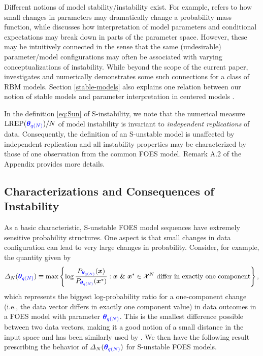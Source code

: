 \documentclass[numbib]{imamat}
\theoremstyle{theorem}
\theoremstyle{lemma}
\theoremstyle{example}
\theoremstyle{corollary}
\theoremstyle{definition}
\theoremstyle{remark}
\theoremstyle{approximation}
\theoremstyle{scheme}
\newcommand{\REP}{\mathrm{LREP}}
\newcommand{\DN}{\Delta_N}
\newcommand{\thetaidx}{q(N)}
\newcommand{\thetaN}{\boldsymbol \theta_{\thetaidx}}
\newcommand{\ak}[1]{{\color{blue} #1}}
\let\BeginKnitrBlock\begin \let\EndKnitrBlock\end
\begin{document}
\BeginKnitrBlock{remark}
\iffalse{} {Remark. } \fi{}\ak{Different notions of model stability/instability exist. For example, \citet{handcock2003assessing} refers to how small changes in parameters may dramatically change a probability mass function, while \citet{kaiser2007statistical} discusses how interpretation of model parameters and conditional expectations may break down in parts of the parameter space. However, these may be intuitively connected in the sense that the same (undesirable) parameter/model configurations may often be associated with varying conceptualizations of instability. While beyond the scope of the current paper, \citet{kaplan2019properties} investigates and numerically demonstrates some such connections for a class of RBM models. Section \ref{stable-models} also explains one relation between our notion of stable models and parameter interpretation in centered models \citep[][cf.]{kaiser2009exploring}. }
\EndKnitrBlock{remark}

\BeginKnitrBlock{remark}
\iffalse{} {Remark. } \fi{}In the definition \eqref{eq:Sun} of S-instability, we note that the numerical measure \(\REP(\ak{\thetaN})/N\) of model instability is invariant to \emph{independent replications} of data. \ak{Consequently, the definition of an
S-unstable model is unaffected by independent replication and all instability properties may be
characterized by those of one observation from the common FOES model. Remark A.2 of the Appendix provides more details.}
\EndKnitrBlock{remark}

\hypertarget{characterizations-and-consequences-of-instability}{%
\subsection{Characterizations and Consequences of Instability}\label{characterizations-and-consequences-of-instability}}

As a basic characteristic, S-unstable FOES model sequences have extremely sensitive probability structures. One aspect is that small changes in data configuration can lead to very large changes in probability. Consider, for example, the quantity given by
\[
\DN(\ak{\thetaN}) \equiv \max \left\{\log \frac{P_{\ak{\thetaN}}(\boldsymbol x)}{P_{\ak{\thetaN}}(\boldsymbol x^*)} : \boldsymbol x \text{ }\& \text{ } \boldsymbol x^* \in \mathcal{X}^N \text{ differ in exactly one component}\right\},
\]
which represents the biggest log-probability ratio for a one-component change \ak{(i.e., the data vector differs in exactly one component value)} in data outcomes in a FOES model with parameter \(\ak{\thetaN}\). \ak{This is the smallest difference possible between two data vectors, making it a good notion of a small distance in the input space and has been similarly used by \citet[][, Sec 2.2]{schweinberger2011instability}.} We then have the following result prescribing the behavior of \(\DN(\ak{\thetaN})\) for S-unstable FOES models.
\end{document}
